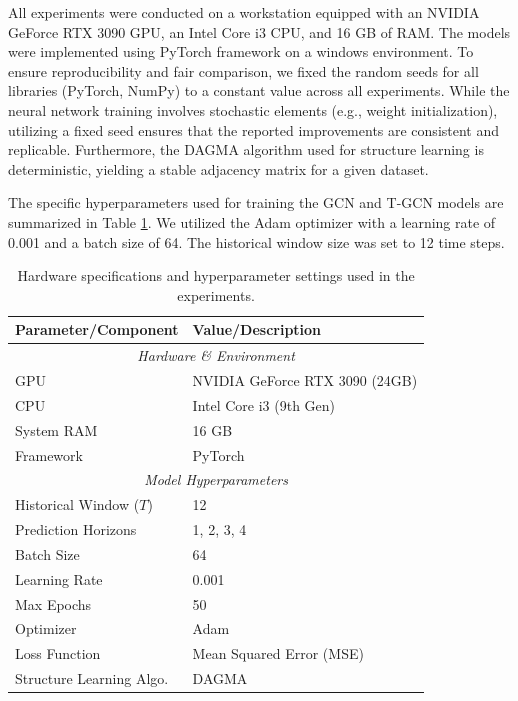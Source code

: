 \documentclass[pdflatex,sn-mathphys-num]{sn-jnl}%
\theoremstyle{thmstyleone}%
\theoremstyle{thmstyletwo}%
\theoremstyle{thmstylethree}%
\begin{document}
All experiments were conducted on a workstation equipped with an NVIDIA GeForce RTX 3090 GPU, an Intel Core i3 CPU, and 16 GB of RAM. The models were implemented using PyTorch framework on a windows environment. To ensure reproducibility and fair comparison, we fixed the random seeds for all libraries (PyTorch, NumPy) to a constant value across all experiments. While the neural network training involves stochastic elements (e.g., weight initialization), utilizing a fixed seed ensures that the reported improvements are consistent and replicable. Furthermore, the DAGMA algorithm used for structure learning is deterministic, yielding a stable adjacency matrix for a given dataset.

The specific hyperparameters used for training the GCN and T-GCN models are summarized in Table \ref{tab:hyperparameters}. We utilized the Adam optimizer with a learning rate of 0.001 and a batch size of 64. The historical window size was set to 12 time steps.%


\begin{table}[t]
\centering
\caption{Hardware specifications and hyperparameter settings used in the experiments.}
\label{tab:hyperparameters}
\begin{tabular}{ll}
\toprule
\textbf{Parameter/Component} & \textbf{Value/Description} \\
\midrule
\multicolumn{2}{c}{\textit{Hardware \& Environment}} \\
\midrule
GPU & NVIDIA GeForce RTX 3090 (24GB) \\
CPU & Intel Core i3 (9th Gen) \\
System RAM & 16 GB \\
Framework & PyTorch \\
\midrule
\multicolumn{2}{c}{\textit{Model Hyperparameters}} \\
\midrule
Historical Window ($T$) & 12 \\
Prediction Horizons & 1, 2, 3, 4 \\
Batch Size & 64 \\
Learning Rate & 0.001 \\
Max Epochs & 50 \\
Optimizer & Adam \\
Loss Function & Mean Squared Error (MSE) \\
Structure Learning Algo. & DAGMA \\
\bottomrule
\end{tabular}
\end{table}
\end{document}
